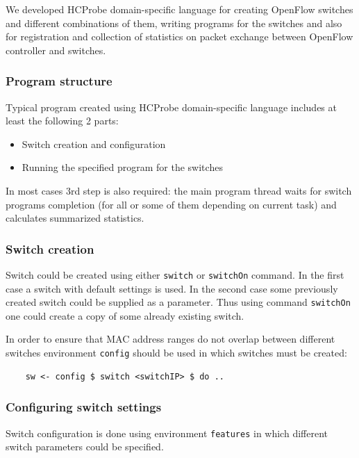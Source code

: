 \documentclass[9pt,a4paper]{article}
\begin{document}
We developed HCProbe domain-specific language for creating OpenFlow
switches and different combinations of them, writing programs for the
switches and also for registration and collection of statistics on
packet exchange between OpenFlow controller and switches.

\subsubsection{Program structure}

Typical program created using HCProbe domain-specific language
includes at least the following 2 parts:

\begin{itemize}
  \item Switch creation and configuration
  \item Running the specified program for the switches
\end{itemize}

In most cases 3rd step is also required: the main program thread
waits for switch programs completion (for all or some of them
depending on current task) and calculates summarized statistics.

\subsubsection{Switch creation}

Switch could be created using either \lstinline!switch! or
\lstinline!switchOn! command.  In the first case a switch with default
settings is used. In the second case some previously created
switch could be supplied as a parameter. Thus using command
\lstinline!switchOn! one could create a copy of some already existing
switch.

In order to ensure that MAC address ranges do not overlap between
different switches environment \lstinline!config! should be used in
which switches must be created:

\begin{lstlisting}
    sw <- config $ switch <switchIP> $ do ..
\end{lstlisting}%

\subsubsection{Configuring switch settings}

Switch configuration is done using environment \lstinline!features! in
which different switch parameters could be specified.
\end{document}
